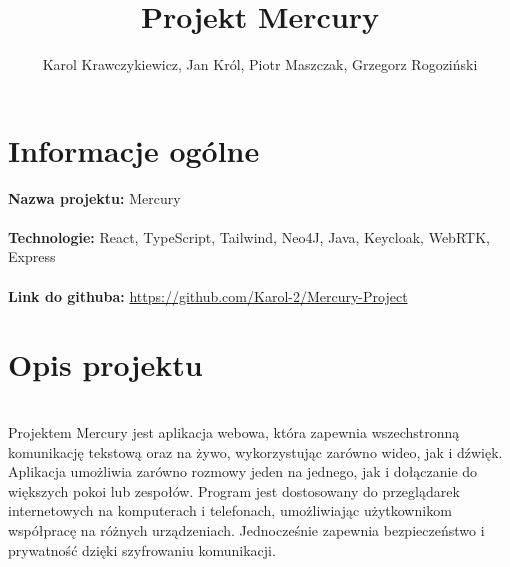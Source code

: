 \documentclass{article}
\title{Projekt Mercury}
\author{Karol Krawczykiewicz, Jan Król, Piotr Maszczak, Grzegorz Rogoziński}
\begin{document}
\maketitle

\section{Informacje ogólne}
\textbf{Nazwa projektu:} Mercury
\\
\\
\textbf{Technologie:} React, TypeScript, Tailwind, Neo4J, Java, Keycloak, WebRTK, Express
\\
\\
\textbf{Link do githuba:}
\url{https://github.com/Karol-2/Mercury-Project}

\section{Opis projektu}
\\
Projektem Mercury jest aplikacja webowa, która zapewnia wszechstronną komunikację tekstową oraz na żywo, wykorzystując zarówno wideo, jak i dźwięk. Aplikacja umożliwia zarówno rozmowy jeden na jednego, jak i dołączanie do większych pokoi lub zespołów. Program jest dostosowany do przeglądarek internetowych na komputerach i telefonach, umożliwiając użytkownikom współpracę na różnych urządzeniach. Jednocześnie zapewnia bezpieczeństwo i prywatność dzięki szyfrowaniu komunikacji.
\\
\end{document}
